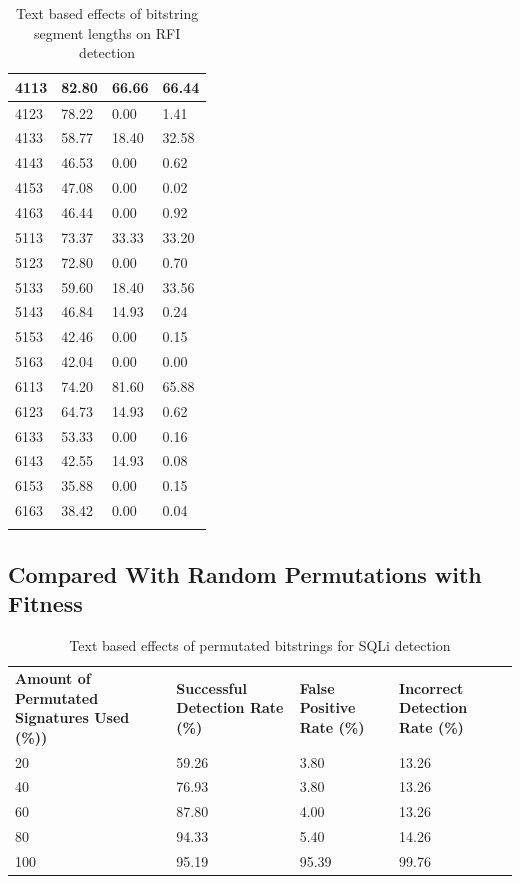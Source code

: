 \begin{appendices}
\begin{longtable}{|p{1.5in}|p{1in}|p{1in}|p{1in}|}
	4113 &  82.80 &  66.66 & 66.44 \\ \hline
	4123 &  78.22 &   0.00 &  1.41 \\ \hline
	4133 &  58.77 &  18.40 & 32.58 \\ \hline
	4143 &  46.53 &   0.00 &  0.62 \\ \hline
	4153 &  47.08 &   0.00 &  0.02 \\ \hline
	4163 &  46.44 &   0.00 &  0.92 \\ \hline
	5113 &  73.37 &  33.33 & 33.20 \\ \hline
	5123 &  72.80 &   0.00 &  0.70 \\ \hline
	5133 &  59.60 &  18.40 & 33.56 \\ \hline
	5143 &  46.84 &  14.93 &  0.24 \\ \hline
	5153 &  42.46 &   0.00 &  0.15 \\ \hline
	5163 &  42.04 &   0.00 &  0.00 \\ \hline
	6113 &  74.20 &  81.60 & 65.88 \\ \hline
	6123 &  64.73 &  14.93 &  0.62 \\ \hline
	6133 &  53.33 &   0.00 &  0.16 \\ \hline
	6143 &  42.55 &  14.93 &  0.08 \\ \hline
	6153 &  35.88 &   0.00 &  0.15 \\ \hline
	6163 &  38.42 &   0.00 &  0.04 \\ \hline
	\caption{Text based effects of bitstring segment lengths on RFI detection}
\end{longtable}

\newpage
\subsection{Compared With Random Permutations with Fitness}

\begin{table}[H]
	\centering
	\begin{tabular}{|p{1.5in}|p{1in}|p{1in}|p{1in}|}
	\hline
	\textbf{Amount of Permutated Signatures Used (\%))} & \textbf{Successful Detection Rate (\%)} & \textbf{False Positive Rate (\%)} & \textbf{Incorrect Detection Rate (\%)}  \\
	\hhline{|=|=|=|=|}
	20	& 59.26	& 3.80 & 13.26 \\ \hline
	40	& 76.93 & 3.80 & 13.26 \\ \hline
	60	& 87.80	& 4.00 & 13.26 \\ \hline
	80	& 94.33 & 5.40 & 14.26 \\ \hline
	100	& 95.19 & 95.39 & 99.76 \\ \hline
	\end{tabular}
	\caption{Text based effects of permutated bitstrings for SQLi detection}
\end{table}


\end{appendices}
